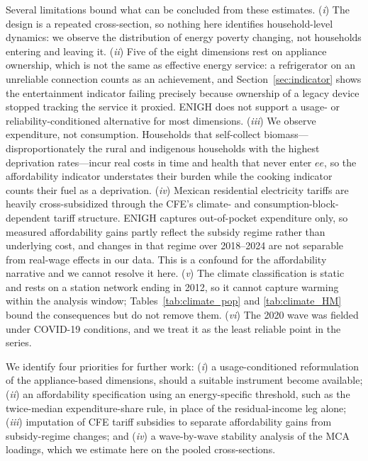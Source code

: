 \documentclass[11pt, a4paper]{article}
\begin{document}
Several limitations bound what can be concluded from these estimates. (\textit{i}) The design is a repeated cross-section, so nothing here identifies household-level dynamics: we observe the distribution of energy poverty changing, not households entering and leaving it. (\textit{ii}) Five of the eight dimensions rest on appliance ownership, which is not the same as effective energy service: a refrigerator on an unreliable connection counts as an achievement, and Section~\ref{sec:indicator} shows the entertainment indicator failing precisely because ownership of a legacy device stopped tracking the service it proxied. ENIGH does not support a usage- or reliability-conditioned alternative for most dimensions. (\textit{iii}) We observe expenditure, not consumption. Households that self-collect biomass---disproportionately the rural and indigenous households with the highest deprivation rates---incur real costs in time and health that never enter $ee$, so the affordability indicator understates their burden while the cooking indicator counts their fuel as a deprivation. (\textit{iv}) Mexican residential electricity tariffs are heavily cross-subsidized through the CFE's climate- and consumption-block-dependent tariff structure. ENIGH captures out-of-pocket expenditure only, so measured affordability gains partly reflect the subsidy regime rather than underlying cost, and changes in that regime over 2018--2024 are not separable from real-wage effects in our data. This is a confound for the affordability narrative and we cannot resolve it here. (\textit{v}) The climate classification is static and rests on a station network ending in 2012, so it cannot capture warming within the analysis window; Tables~\ref{tab:climate_pop} and \ref{tab:climate_HM} bound the consequences but do not remove them. (\textit{vi}) The 2020 wave was fielded under COVID-19 conditions, and we treat it as the least reliable point in the series.

We identify four priorities for further work: (\textit{i}) a usage-conditioned reformulation of the appliance-based dimensions, should a suitable instrument become available; (\textit{ii}) an affordability specification using an energy-specific threshold, such as the twice-median expenditure-share rule, in place of the residual-income leg alone; (\textit{iii}) imputation of CFE tariff subsidies to separate affordability gains from subsidy-regime changes; and (\textit{iv}) a wave-by-wave stability analysis of the MCA loadings, which we estimate here on the pooled cross-sections.
\end{document}
